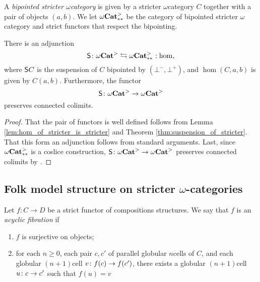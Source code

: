 \begin{dfn} 
    A \emph{bipointed stricter \( \omega \)\nbd category} is given by a stricter \( \omega \)\nbd category \( C \) together with a pair of objects \( (a, b) \).
    We let \( {\omega\mathbf{Cat}}^>_{**} \) be the category of bipointed stricter \( \omega \)\nbd category and strict functors that respect the bipointing.
\end{dfn}

\begin{cor} \label{cor:adjunction_hom_suspension}
    There is an adjunction
    \begin{equation*}
        \sus{} \colon \somegaCat \leftrightarrows \bpt\somegaCat \cocolon \hom,
    \end{equation*}
    where \( \mathsf{S}{C} \) is the suspension of \( C \) bipointed by \( (\bot^-, \bot^+) \), and \( \hom(C, a, b) \) is given by \( C(a, b) \).
    Furthermore, the functor
    \begin{equation*}
        \mathsf{S}{} \colon {\omega\mathbf{Cat}}^> \to {\omega\mathbf{Cat}}^>
    \end{equation*}
    preserves connected colimits.
\end{cor}
\begin{proof}
    That the pair of functors is well defined follows from Lemma \ref{lem:hom_of_stricter_is_stricter} and Theorem \ref{thm:suspension_of_stricter}.
    That this form an adjunction follows from standard arguments.
    Last, since \( {\omega\mathbf{Cat}}^>_{**} \) is a coslice construction, \( \mathsf{S}{} \colon {\omega\mathbf{Cat}}^> \to {\omega\mathbf{Cat}}^> \) preserves connected colimits by \cite[Proposition 3.3.8]{riehl2019context}.
\end{proof}

\subsection{Folk model structure on stricter \texorpdfstring{$\omega$}{}-categories}

\begin{dfn}  \label{dfn:acyclic_fibration}
    Let \( f \colon C \to D \) be a strict functor of compositions structures.
    We say that \( f \) is an \emph{acyclic fibration} if
    \begin{enumerate}
        \item \( f \) is surjective on objects;
        \item for each \( n \geq 0 \), each pair \( c, c' \) of parallel globular \( n \)\nbd cells of \( C \), and each globular \( (n + 1) \)\nbd cell \( v \colon f(c) \to f(c') \), there exists a globular \( (n + 1) \)\nbd cell \( u \colon c \to c' \) such that \( f(u) = v \)
    \end{enumerate}
\end{dfn}

